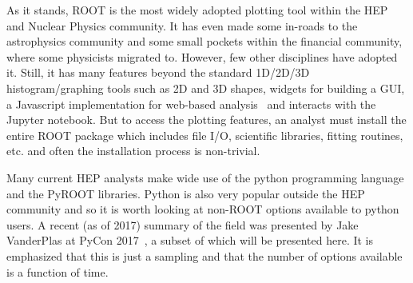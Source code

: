 \documentclass[12pt,a4paper]{article}
\begin{document}
As it stands, ROOT is the most widely adopted plotting tool within the HEP and Nuclear Physics community.
It has even made some in-roads to the astrophysics community and some small pockets within the financial community,
where some physicists migrated to. However, few other disciplines have adopted it. Still, it has many features beyond
the standard 1D/2D/3D histogram/graphing tools such as 2D and 3D shapes, widgets for building a GUI, a Javascript
implementation for web-based analysis~\cite{rootjs} and interacts with the Jupyter notebook. But to
access the plotting features, an analyst must install the entire ROOT package which includes file I/O, scientific
libraries, fitting routines, etc. and often the installation process is non-trivial.

Many current HEP analysts make wide use of the python programming language and the PyROOT libraries.
Python is also very popular outside the HEP community and so it is worth looking at non-ROOT options available to python users.
A recent (as of 2017) summary of the field was presented by Jake VanderPlas at PyCon 2017~\cite{VanderPlas2017}, a subset
of which will be presented here. It is emphasized that this is just a sampling and that the number of options available
is a function of time.
\end{document}
